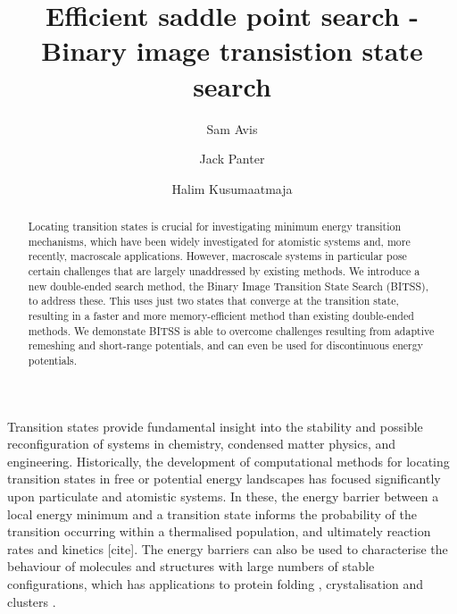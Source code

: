 \documentclass[aps,twocolumn]{revtex4-1}
\newcommand{\temp}[1]{{\leavevmode\color{red}#1}}
\begin{document}
\title{Efficient saddle point search - Binary image transistion state search}
\author{Sam Avis}
\author{Jack Panter}
\author{Halim Kusumaatmaja}

\begin{abstract}
  Locating transition states is crucial for investigating minimum energy transition mechanisms, which have been widely investigated for atomistic systems and, more recently, macroscale applications.
  However, macroscale systems in particular pose certain challenges that are largely unaddressed by existing methods.
  We introduce a new double-ended search method, the Binary Image Transition State Search (BITSS), to address these.
  This uses just two states that converge at the transition state, resulting in a faster and more memory-efficient method than existing double-ended methods.
  We demonstate BITSS is able to overcome challenges resulting from adaptive remeshing and short-range potentials, and can even be used for discontinuous energy potentials.
\end{abstract}

\maketitle


\topic Transition states provide fundamental insight into the stability and possible reconfiguration of systems in chemistry, condensed matter physics, and engineering.
Historically, the development of computational methods for locating transition states in free or potential energy landscapes has focused significantly upon particulate and atomistic systems.
In these, the energy barrier between a local energy minimum and a transition state informs the probability of the transition occurring within a thermalised population, and ultimately reaction rates and kinetics \temp{[cite]}.
The energy barriers can also be used to characterise the behaviour of molecules and structures with large numbers of stable configurations, which has applications to protein folding \cite{Bryngelson1995,Onuchic1997}, crystalisation and clusters \cite{Wales1998,Wales2012}.
\end{document}
